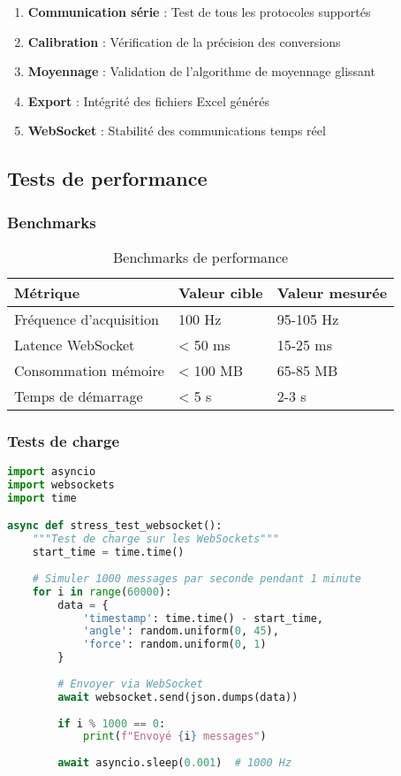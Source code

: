 \documentclass[12pt,a4paper]{article}
\begin{document}
\begin{enumerate}
    \item \textbf{Communication série} : Test de tous les protocoles supportés
    \item \textbf{Calibration} : Vérification de la précision des conversions
    \item \textbf{Moyennage} : Validation de l'algorithme de moyennage glissant
    \item \textbf{Export} : Intégrité des fichiers Excel générés
    \item \textbf{WebSocket} : Stabilité des communications temps réel
\end{enumerate}

\subsection{Tests de performance}

\subsubsection{Benchmarks}

\begin{table}[H]
\centering
\begin{tabular}{|l|l|l|}
\hline
\textbf{Métrique} & \textbf{Valeur cible} & \textbf{Valeur mesurée} \\
\hline
Fréquence d'acquisition & 100 Hz & 95-105 Hz \\
\hline
Latence WebSocket & < 50 ms & 15-25 ms \\
\hline
Consommation mémoire & < 100 MB & 65-85 MB \\
\hline
Temps de démarrage & < 5 s & 2-3 s \\
\hline
\end{tabular}
\caption{Benchmarks de performance}
\label{tab:benchmarks}
\end{table}

\subsubsection{Tests de charge}

\begin{lstlisting}[language=python, caption=Test de charge WebSocket]
import asyncio
import websockets
import time

async def stress_test_websocket():
    """Test de charge sur les WebSockets"""
    start_time = time.time()
    
    # Simuler 1000 messages par seconde pendant 1 minute
    for i in range(60000):
        data = {
            'timestamp': time.time() - start_time,
            'angle': random.uniform(0, 45),
            'force': random.uniform(0, 1)
        }
        
        # Envoyer via WebSocket
        await websocket.send(json.dumps(data))
        
        if i % 1000 == 0:
            print(f"Envoyé {i} messages")
        
        await asyncio.sleep(0.001)  # 1000 Hz
\end{lstlisting}
\end{document}
